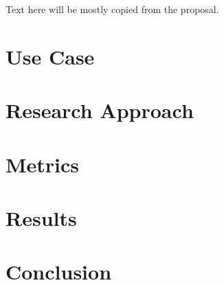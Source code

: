 \documentclass{acm_proc_article-sp}
\begin{document}
Text here will be mostly copied from the proposal.

\section{Use Case}

\section{Research Approach}


\section{Metrics}

\section{Results}

\section{Conclusion}



\end{document}
